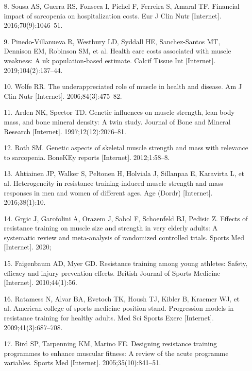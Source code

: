 \documentclass[twoside,10pt]{gihclass} %
\begin{document}
\leavevmode\hypertarget{ref-RN2532}{}%
8. Sousa AS, Guerra RS, Fonseca I, Pichel F, Ferreira S, Amaral TF. Financial impact of sarcopenia on hospitalization costs. Eur J Clin Nutr {[}Internet{]}. 2016;70(9):1046--51.

\leavevmode\hypertarget{ref-RN2184}{}%
9. Pinedo-Villanueva R, Westbury LD, Syddall HE, Sanchez-Santos MT, Dennison EM, Robinson SM, et al. Health care costs associated with muscle weakness: A uk population-based estimate. Calcif Tissue Int {[}Internet{]}. 2019;104(2):137--44.

\leavevmode\hypertarget{ref-RN763}{}%
10. Wolfe RR. The underappreciated role of muscle in health and disease. Am J Clin Nutr {[}Internet{]}. 2006;84(3):475--82.

\leavevmode\hypertarget{ref-RN2526}{}%
11. Arden NK, Spector TD. Genetic influences on muscle strength, lean body mass, and bone mineral density: A twin study. Journal of Bone and Mineral Research {[}Internet{]}. 1997;12(12):2076--81.

\leavevmode\hypertarget{ref-RN2527}{}%
12. Roth SM. Genetic aspects of skeletal muscle strength and mass with relevance to sarcopenia. BoneKEy reports {[}Internet{]}. 2012;1:58--8.

\leavevmode\hypertarget{ref-RN1741}{}%
13. Ahtiainen JP, Walker S, Peltonen H, Holviala J, Sillanpaa E, Karavirta L, et al. Heterogeneity in resistance training-induced muscle strength and mass responses in men and women of different ages. Age (Dordr) {[}Internet{]}. 2016;38(1):10.

\leavevmode\hypertarget{ref-RN2534}{}%
14. Grgic J, Garofolini A, Orazem J, Sabol F, Schoenfeld BJ, Pedisic Z. Effects of resistance training on muscle size and strength in very elderly adults: A systematic review and meta-analysis of randomized controlled trials. Sports Med {[}Internet{]}. 2020;

\leavevmode\hypertarget{ref-RN2536}{}%
15. Faigenbaum AD, Myer GD. Resistance training among young athletes: Safety, efficacy and injury prevention effects. British Journal of Sports Medicine {[}Internet{]}. 2010;44(1):56.

\leavevmode\hypertarget{ref-RN1}{}%
16. Ratamess N, Alvar BA, Evetoch TK, Housh TJ, Kibler B, Kraemer WJ, et al. American college of sports medicine position stand. Progression models in resistance training for healthy adults. Med Sci Sports Exerc {[}Internet{]}. 2009;41(3):687--708.

\leavevmode\hypertarget{ref-RN798}{}%
17. Bird SP, Tarpenning KM, Marino FE. Designing resistance training programmes to enhance muscular fitness: A review of the acute programme variables. Sports Med {[}Internet{]}. 2005;35(10):841--51.
\end{document}
